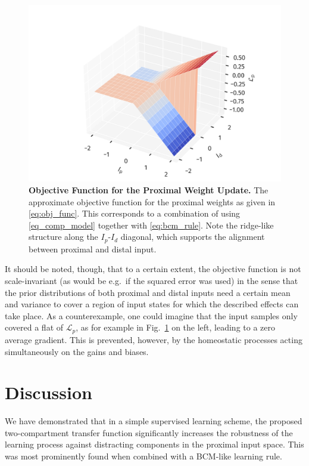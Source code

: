 \documentclass[utf8]{frontiersSCNS} %
\begin{document}
\begin{figure}[t]
\centering
\includegraphics[width=0.7\columnwidth]{obj_func}
\caption{{\bf Objective Function for the Proximal Weight Update.} The 
	approximate objective function for the proximal weights as given in
	\eqref{eq:obj_func}. This corresponds to a combination of using 
	\eqref{eq_comp_model} together with \eqref{eq:bcm_rule}. Note the ridge-like
	structure along the $I_p$-$I_d$ diagonal, which supports the alignment between
	proximal and distal input.}
\label{fig:obj_func}
\end{figure}

It should be noted, though, that to a certain extent, the objective 
function is not scale-invariant (as would be e.g.\ if 
the squared error was used) in the sense 
that the prior distributions of both proximal 
and distal inputs need a certain mean and variance to cover a region of input
states for which the described effects can take place. 
As a counterexample, one could imagine that the input samples 
only covered a flat of $\mathcal{L}_p$, as for example in 
Fig.~\ref{fig:obj_func} on the left, leading to a zero average gradient. 
This is prevented, however, by the homeostatic processes 
acting simultaneously on the gains
and biases.

\section{Discussion}

We have demonstrated that in a simple supervised learning scheme, the
proposed two-compartment transfer function significantly increases
the robustness of the learning process against distracting components
in the proximal input space. This was most prominently found when
combined with a BCM-like learning rule.
\end{document}
